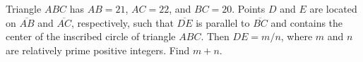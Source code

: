 Triangle $ABC$ has $AB=21$, $AC=22$, and $BC=20$.  Points $D$ and $E$ are located on $\overline{AB}$ and $\overline{AC}$, respectively, such that $\overline{DE}$ is parallel to $\overline{BC}$ and contains the center of the inscribed circle of triangle $ABC$.  Then $DE=m/n$, where $m$ and $n$ are relatively prime positive integers.  Find $m+n$.
